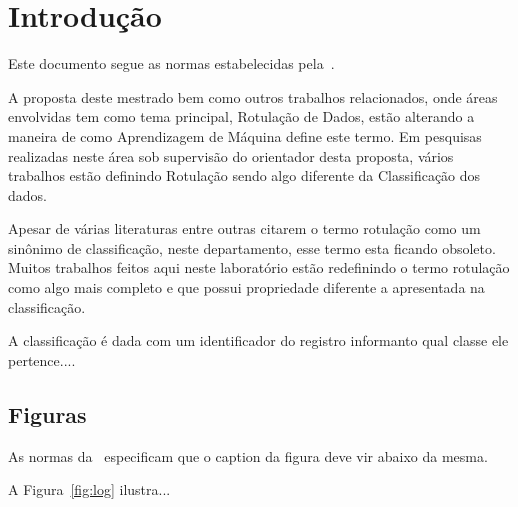 
\chapter*[Introdução]{Introdução}

Este documento segue as normas estabelecidas pela~.

A proposta deste mestrado bem como outros trabalhos relacionados, onde áreas envolvidas tem como tema principal, Rotulação de Dados, estão alterando a maneira de como Aprendizagem de Máquina define este termo. Em pesquisas realizadas neste área sob supervisão do orientador desta proposta, vários trabalhos estão definindo Rotulação sendo algo diferente da Classificação dos dados. 

Apesar de várias literaturas \cite{Barber2011,Mitchell1997} entre outras citarem o termo rotulação como um sinônimo de classificação, neste departamento, esse termo esta ficando obsoleto. Muitos trabalhos feitos aqui neste laboratório estão redefinindo o termo rotulação como algo mais completo e que possui propriedade diferente a apresentada na classificação.

A classificação é dada com um identificador do registro informanto qual classe ele pertence....

\section*{Figuras}\label{sec:figuras}

As normas da~ especificam que o caption da figura deve vir abaixo da mesma.

A Figura~\ref{fig:log} ilustra...

